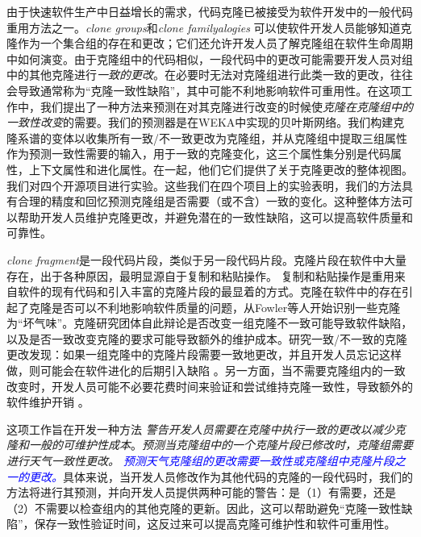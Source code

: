 

由于快速软件生产中日益增长的需求，代码克隆已被接受为软件开发中的一般代码重用方法之一。{\em clone groups}和{\em   clone familyalogies }可以使软件开发人员能够知道克隆作为一个集合组的存在和更改；它们还允许开发人员了解克隆组在软件生命周期中如何演变。由于克隆组中的代码相似，一段代码中的更改可能需要开发人员对组中的其他克隆进行{\em 一致的更改}。在必要时无法对克隆组进行此类一致的更改，往往会导致通常称为“克隆一致性缺陷”，其中可能不利地影响软件可重用性。在这项工作中，我们提出了一种方法来预测在对其克隆进行改变的时候使{\em 克隆在克隆组中的一致性改变}的需要。我们的预测器是在WEKA中实现的贝叶斯网络。我们构建克隆系谱的变体以收集所有一致/不一致更改为克隆组，并从克隆组中提取三组属性作为预测一致性需要的输入，用于一致的克隆变化，这三个属性集分别是代码属性，上下文属性和进化属性。在一起，他们它们提供了关于克隆更改的整体视图。我们对四个开源项目进行实验。这些我们在四个项目上的实验表明，我们的方法具有合理的精度和回忆预测克隆组是否需要（或不含）一致的变化。这种整体方法可以帮助开发人员维护克隆更改，并避免潜在的一致性缺陷，这可以提高软件质量和可靠性。


{\em clone fragment}是一段代码片段，类似于另一段代码片段\cite{koschke2007survey}。克隆片段在软件中大量存在，出于各种原因，最明显源自于复制和粘贴操作。
复制和粘贴操作是重用来自软件的现有代码和引入丰富的克隆片段的最显着的方式。克隆在软件中的存在引起了克隆是否可以不利地影响软件质量的问题，从Fowler等人开始识别一些克隆为“坏气味”\cite{fowler2009refactoring}。克隆研究团体自此辩论是否改变一组克隆不一致可能导致软件缺陷，以及是否一致改变克隆的要求可能导致额外的维护成本。研究一致/不一致的克隆更改发现：如果一组克隆中的克隆片段需要一致地更改，并且开发人员忘记这样做，则可能会在软件进化的后期引入缺陷\cite{bettenburg2009empirical} \cite {juergens2009code}。另一方面，当不需要克隆组内的一致改变时，开发人员可能不必要花费时间来验证和尝试维持克隆一致性，导致额外的软件维护开销\cite{aversano2007clones} \cite{barbour2011late}。

这项工作旨在开发一种方法 {\em 警告开发人员需要在克隆中执行一致的更改以减少克隆和一般的可维护性成本}。{\em 预测当克隆组中的一个克隆片段已修改时，克隆组需要进行天气一致性更改。} \textcolor {blue}{\em 预测天气克隆组的更改需要一致性或克隆组中克隆片段之一的更改。}具体来说，当开发人员修改作为其他代码的克隆的一段代码时，我们的方法将进行其预测，并向开发人员提供两种可能的警告：是（1）有需要，还是（2）不需要以检查组内的其他克隆的更新。因此，这可以帮助避免“克隆一致性缺陷”，保存一致性验证时间，这反过来可以提高克隆可维护性和软件可重用性。

